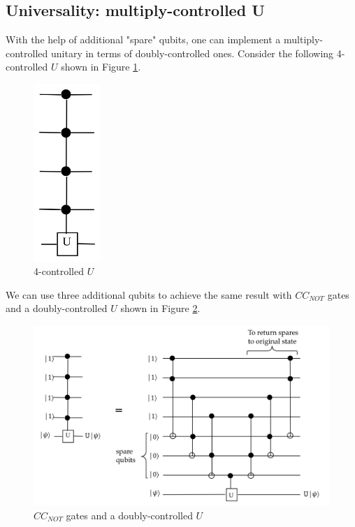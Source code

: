 \documentclass[main.tex]{subfiles}
\begin{document}
\subsection{Universality: multiply-controlled U}

    With the help of additional "spare" qubits, one can implement a multiply-controlled unitary in terms of doubly-controlled ones. Consider the following 4-controlled $U$ shown in Figure \ref{fig:16multicontrol}.
    
    \begin{figure}
        \centering
        \includegraphics[width=1in]{notes/figs/n09/16multicontrol.png}
        \caption{4-controlled $U$}
        \label{fig:16multicontrol}
    \end{figure}
    
    We can use three additional qubits to achieve the same result with $CC_{NOT}$ gates and a doubly-controlled $U$ shown in Figure \ref{fig:17multicontrol2}.
    
    \begin{figure}
        \centering
        \includegraphics[width=5in]{notes/figs/n09/17multicontrol2.png}
        \caption{$CC_{NOT}$ gates and a doubly-controlled $U$}
        \label{fig:17multicontrol2}
    \end{figure}
    
\end{document}
